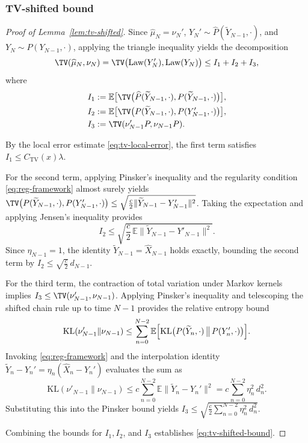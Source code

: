 \documentclass[11pt,a4paper,reqno]{amsart}
\theoremstyle{plain}
\theoremstyle{definition}
\theoremstyle{remark}
\newcommand{\E}{\mathbb{E}}
\newcommand{\KL}{\mathrm{KL}}
\DeclareMathOperator{\Law}{Law}
\begin{document}
\subsubsection{TV-shifted bound} \label{se:TV-shifted}
\begin{proof}[Proof of Lemma~\ref{lem:tv-shifted}]
Since $\widehat\mu_N=\nu_N'$, $Y_N'\sim \widehat P(\widetilde Y_{N-1},\cdot)$, and $Y_N\sim P(Y_{N-1},\cdot)$, applying the triangle inequality yields the decomposition
\[
  \TV(\widehat\mu_N,\nu_N)
  =
  \TV\bigl(\Law(Y_N'),\Law(Y_N)\bigr)
  \le I_1+I_2+I_3,
\]
where
\begin{align*}
  I_1 &:= \E\bigl[\TV\bigl(\widehat P(\widetilde Y_{N-1},\cdot),P(\widetilde Y_{N-1},\cdot)\bigr)\bigr],\\
  I_2 &:= \E\bigl[\TV\bigl(P(\widetilde Y_{N-1},\cdot),P(Y'_{N-1},\cdot)\bigr)\bigr],\\
  I_3 &:= \TV(\nu'_{N-1}P,\nu_{N-1}P).
\end{align*}

By the local error estimate \eqref{eq:tv-local-error}, the first term satisfies $I_1\le C_{\mathrm{TV}}(x)\lambda$.

For the second term, applying Pinsker's inequality and the regularity condition \eqref{eq:reg-framework} almost surely yields $\TV\bigl(P(\widetilde Y_{N-1},\cdot),P(Y'_{N-1},\cdot)\bigr) \le \sqrt{\frac{c}{2}\|\widetilde Y_{N-1}-Y'_{N-1}\|^2}$. Taking the expectation and applying Jensen's inequality provides
\[
  I_2 \le \sqrt{\frac{c}{2}\,\E\|\widetilde Y_{N-1}-Y'_{N-1}\|^2}.
\]
Since $\eta_{N-1}=1$, the identity $\widetilde Y_{N-1}=\widehat X_{N-1}$ holds exactly, bounding the second term by $I_2 \le \sqrt{\frac{c}{2}}\,d_{N-1}$.

For the third term, the contraction of total variation under Markov kernels implies $I_3\le \TV(\nu'_{N-1},\nu_{N-1})$. Applying Pinsker's inequality and telescoping the shifted chain rule up to time $N-1$ provides the relative entropy bound
\[
  \KL(\nu'_{N-1}\|\nu_{N-1}) \le \sum_{n=0}^{N-2}\E\Bigl[\KL\bigl(P(\widetilde Y_n,\cdot)\,\big\|\,P(Y_n',\cdot)\bigr)\Bigr].
\]
Invoking \eqref{eq:reg-framework} and the interpolation identity $\widetilde Y_n-Y_n'=\eta_n(\widehat X_n-Y_n')$ evaluates the sum as
\[
  \KL(\nu'_{N-1}\|\nu_{N-1}) \le c\sum_{n=0}^{N-2}\E\|\widetilde Y_n-Y_n'\|^2 = c\sum_{n=0}^{N-2}\eta_n^2\,d_n^2.
\]
Substituting this into the Pinsker bound yields $I_3 \le \sqrt{\frac{c}{2}\sum_{n=0}^{N-2}\eta_n^2\,d_n^2}$.

Combining the bounds for $I_1, I_2$, and $I_3$ establishes \eqref{eq:tv-shifted-bound}.
\end{proof}
\end{document}

